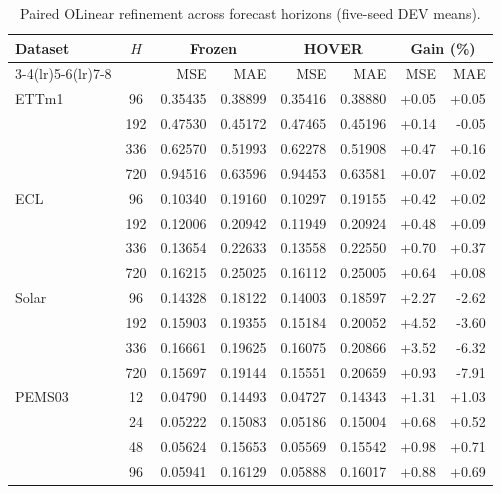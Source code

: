 \begin{table}[t]
\caption{Paired OLinear refinement across forecast horizons (five-seed DEV means).}
\label{tab:horizon}
\centering
\begingroup
\setlength{\tabcolsep}{3.8pt}
\renewcommand{\arraystretch}{1.19}
\fontsize{8.6}{10.2}\selectfont
\begin{tabular*}{\columnwidth}{@{\extracolsep{\fill}}lc|rr|rr|rr@{}}
\toprule
\multirow{2}{*}{Dataset} & \multirow{2}{*}{$H$} & \multicolumn{2}{c|}{Frozen} & \multicolumn{2}{c|}{HOVER} & \multicolumn{2}{c}{Gain (\%)} \\
\cmidrule(lr){3-4}\cmidrule(lr){5-6}\cmidrule(lr){7-8}
 &  & MSE & MAE & MSE & MAE & MSE & MAE \\
\midrule
ETTm1 & 96 & 0.35435 & 0.38899 & 0.35416 & 0.38880 & +0.05 & +0.05 \\
 & 192 & 0.47530 & 0.45172 & 0.47465 & 0.45196 & +0.14 & -0.05 \\
 & 336 & 0.62570 & 0.51993 & 0.62278 & 0.51908 & +0.47 & +0.16 \\
 & 720 & 0.94516 & 0.63596 & 0.94453 & 0.63581 & +0.07 & +0.02 \\
\midrule
ECL & 96 & 0.10340 & 0.19160 & 0.10297 & 0.19155 & +0.42 & +0.02 \\
 & 192 & 0.12006 & 0.20942 & 0.11949 & 0.20924 & +0.48 & +0.09 \\
 & 336 & 0.13654 & 0.22633 & 0.13558 & 0.22550 & +0.70 & +0.37 \\
 & 720 & 0.16215 & 0.25025 & 0.16112 & 0.25005 & +0.64 & +0.08 \\
\midrule
Solar & 96 & 0.14328 & 0.18122 & 0.14003 & 0.18597 & +2.27 & -2.62 \\
 & 192 & 0.15903 & 0.19355 & 0.15184 & 0.20052 & +4.52 & -3.60 \\
 & 336 & 0.16661 & 0.19625 & 0.16075 & 0.20866 & +3.52 & -6.32 \\
 & 720 & 0.15697 & 0.19144 & 0.15551 & 0.20659 & +0.93 & -7.91 \\
\midrule
PEMS03 & 12 & 0.04790 & 0.14493 & 0.04727 & 0.14343 & +1.31 & +1.03 \\
 & 24 & 0.05222 & 0.15083 & 0.05186 & 0.15004 & +0.68 & +0.52 \\
 & 48 & 0.05624 & 0.15653 & 0.05569 & 0.15542 & +0.98 & +0.71 \\
 & 96 & 0.05941 & 0.16129 & 0.05888 & 0.16017 & +0.88 & +0.69 \\
\bottomrule
\end{tabular*}
\endgroup
\end{table}
